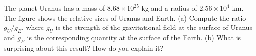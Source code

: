  The planet Uranus has a mass of $8.68\times10^{25}$  kg
and a radius of $2.56\times10^4$  km. The figure shows the
relative sizes of Uranus and Earth.\hwendpart
 (a) Compute the ratio
$g_U/g_E$, where $g_U$ is the strength of the gravitational
field at the surface of Uranus and $g_E$ is the corresponding
quantity at the surface of the Earth.\answercheck\hwendpart
 (b) What is surprising
about this result? How do you explain it?
